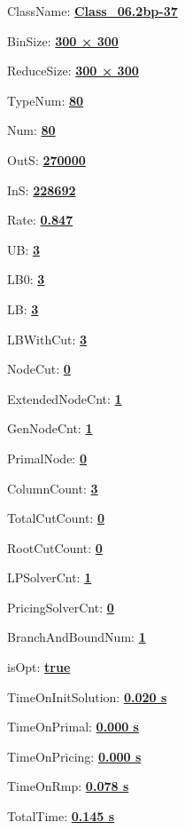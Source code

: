 \documentclass[11pt]{article}
\begin{document}
\pagestyle{empty}


ClassName: \underline{\textbf{Class_06.2bp-37}}
\par
BinSize: \underline{\textbf{300 × 300}}
\par
ReduceSize: \underline{\textbf{300 × 300}}
\par
TypeNum: \underline{\textbf{80}}
\par
Num: \underline{\textbf{80}}
\par
OutS: \underline{\textbf{270000}}
\par
InS: \underline{\textbf{228692}}
\par
Rate: \underline{\textbf{0.847}}
\par
UB: \underline{\textbf{3}}
\par
LB0: \underline{\textbf{3}}
\par
LB: \underline{\textbf{3}}
\par
LBWithCut: \underline{\textbf{3}}
\par
NodeCut: \underline{\textbf{0}}
\par
ExtendedNodeCnt: \underline{\textbf{1}}
\par
GenNodeCnt: \underline{\textbf{1}}
\par
PrimalNode: \underline{\textbf{0}}
\par
ColumnCount: \underline{\textbf{3}}
\par
TotalCutCount: \underline{\textbf{0}}
\par
RootCutCount: \underline{\textbf{0}}
\par
LPSolverCnt: \underline{\textbf{1}}
\par
PricingSolverCnt: \underline{\textbf{0}}
\par
BranchAndBoundNum: \underline{\textbf{1}}
\par
isOpt: \underline{\textbf{true}}
\par
TimeOnInitSolution: \underline{\textbf{0.020 s}}
\par
TimeOnPrimal: \underline{\textbf{0.000 s}}
\par
TimeOnPricing: \underline{\textbf{0.000 s}}
\par
TimeOnRmp: \underline{\textbf{0.078 s}}
\par
TotalTime: \underline{\textbf{0.145 s}}
\par
\newpage
\end{document}
